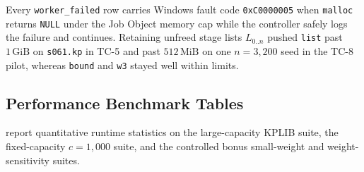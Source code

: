 \documentclass[10pt, a4paper]{article}
\newcommand{\code}[1]{\texttt{\color{primary!90!black}#1}}
\begin{document}
Every \code{worker\_failed} row carries Windows fault code \code{0xC0000005} when \code{malloc} returns \code{NULL} under the Job Object memory cap while the controller safely logs the failure and continues. Retaining unfreed stage lists $L_{0..n}$ pushed \code{list} past $1\,\text{GiB}$ on \code{s061.kp} in TC-5 and past $512\,\text{MiB}$ on one $n = 3{,}200$ seed in the TC-8 pilot, whereas \code{bound} and \code{w3} stayed well within limits.

\subsection{Performance Benchmark Tables}
 report quantitative runtime statistics on the large-capacity KPLIB suite, the fixed-capacity $c = 1{,}000$ suite, and the controlled bonus small-weight and weight-sensitivity suites.
\end{document}
